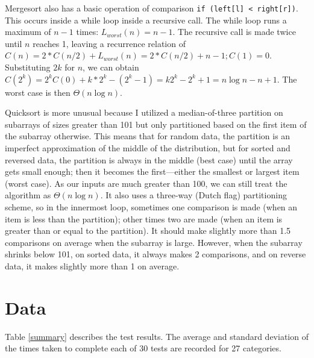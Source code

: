 \documentclass{article}
\begin{document}
Mergesort also has a basic operation of comparison \texttt{if (left[l] < right[r])}.  This occurs inside a while loop inside a recursive call.  The while loop runs a maximum of $n-1$ times: $L_{worst}(n) = n-1$.  The recursive call is made twice until $n$ reaches 1, leaving a recurrence relation of $C(n) = 2*C(n/2) + L_{worst}(n) = 2*C(n/2)+n-1; C(1)=0$.  Substituting $2k$ for $n$, we can obtain $C(2^k) = 2^kC(0)+k*2^k - (2^k-1) = k2^k-2^k+1 = n\log n - n + 1$.  The worst case is then $\Theta(n\log n)$.  

Quicksort is more unusual because I utilized a median-of-three partition on subarrays of sizes greater than 101 but only partitioned based on the first item of the subarray otherwise.  This means that for random data, the partition is an imperfect approximation of the middle of the distribution, but for sorted and reversed data, the partition is always in the middle (best case) until the array gets small enough; then it becomes the first---either the smallest or largest item (worst case).  As our inputs are much greater than 100, we can still treat the algorithm as $\Theta (n\log n)$.  
It also uses a three-way (Dutch flag) partitioning scheme, so in the innermost loop, sometimes one comparison is made (when an item is less than the partition); other times two are made (when an item is greater than or equal to the partition).  It should make slightly more than 1.5 comparisons on average when the subarray is large.  However, when the subarray shrinks below 101, on sorted data, it always makes 2 comparisons, and on reverse data, it makes slightly more than 1 on average.  


\section{Data}

Table \ref{summary} describes the test results.  The average and standard deviation of the times taken to complete each of 30 tests are recorded for 27 categories.   
\end{document}
